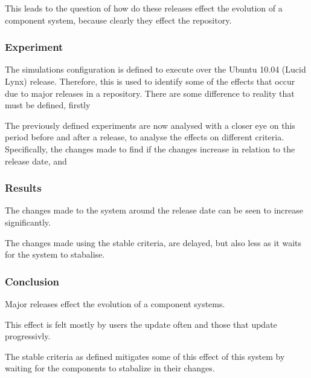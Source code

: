 This leads to the question of how do these releases effect the evolution of a component system, because clearly they effect the repository.

\subsubsection{Experiment}
The simulations configuration is defined to execute over the Ubuntu 10.04 (Lucid Lynx) release.
Therefore, this is used to identify some of the effects that occur due to major releases in a repository.
There are some difference to reality that must be defined, firstly   

The previously defined experiments are now analysed with a closer eye on this period before and after a release, to analyse the effects on different criteria.
Specifically, the changes made to find if the changes increase in relation to the release date, and 

\subsubsection{Results}
The changes made to the system around the release date can be seen to increase significantly.

The changes made using the stable criteria, are delayed, but also less as it waits for the system to stabalise.

\subsubsection{Conclusion}
Major releases effect the evolution of a component systems.

This effect is felt mostly by users the update often and those that update progressivly.

The stable criteria as defined mitigates some of this effect of this system by waiting for the components to stabalize in their changes.

